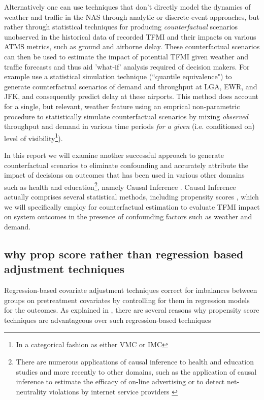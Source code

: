 \documentclass[11pt]{scrartcl}
\begin{document}
Alternatively one can use techniques that don't directly model the dynamics of weather and traffic in the NAS through analytic or discrete-event approaches, but rather through statistical techniques for producing \emph{counterfactual} scenarios unobserved in the historical data of recorded TFMI and their impacts on various ATMS metrics, such as ground and airborne delay.  These counterfactual scenarios can then be used to estimate the impact of potential TFMI given weather and traffic forecasts and thus aid 'what-if' analysis required of decision makers.  For example\cite{kim2013} use a statistical simulation technique (``quantile equivalence") to generate counterfactual scenarios of demand and throughput at LGA, EWR, and JFK, and consequently predict delay at these airports.  This method does account for a single, but relevant, weather feature using an emprical non-parametric procedure to statistically simulate counterfactual scenarios by mixing \emph{observed} throughput and demand in various time periods \emph{for a given} (i.e. conditioned on) level of visibility\footnote{In a categorical fashion as either VMC or IMC}).  


In this report we will examine another successful approach to generate counterfactual scenarios to eliminate confounding and accurately attribute the impact of decisions on outcomes that has been used in various other domains such as health \cite{victora2004evidence} and education\footnote{There are numerous applications of causal inference to health and education studies and more recently to other domains, such as the application of causal inference to estimate the efficacy of on-line advertising \cite{bottou2013counterfactual} or to detect net-neutrality violations by internet service providers \cite{tariq2009detecting}}, namely Causal Inference \cite{austin2011introduction}.  Causal Inference actually comprises several statistical methods, including propensity scores \cite{austin2011tutorial}, which we will specifically employ for counterfactual estimation to evaluate TFMI impact on system outcomes in the presence of confounding factors such as weather and demand.  

\subsection*{why prop score rather than regression based adjustment techniques}

Regression-based covariate adjustment techniques correct for imbalances between groups on pretreatment covariates by controlling for them in regression models for the outcomes.  As explained in  \cite{mccaffrey2013tutorial}, there are several reasons why propensity score techniques are advantageous over such regression-based techniques
\end{document}
